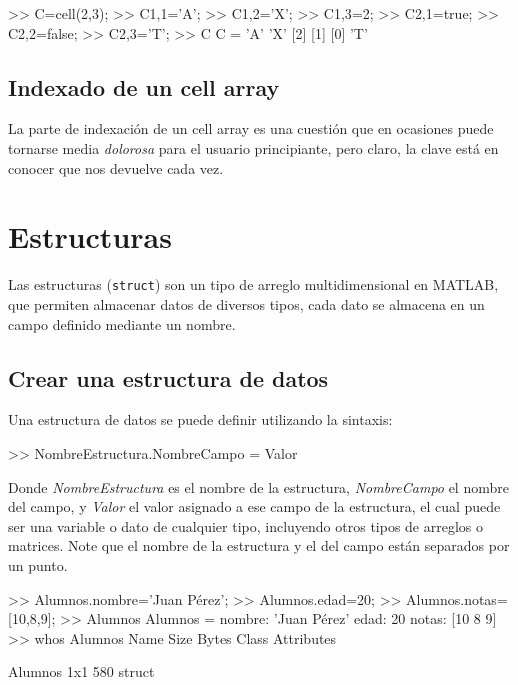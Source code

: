 \begin{matlab}
>> C=cell(2,3);
>> C{1,1}='A';
>> C{1,2}='X';
>> C{1,3}=2;
>> C{2,1}=true;
>> C{2,2}=false;
>> C{2,3}='T';
>> C
C = 
    'A'    'X'    [2]
    [1]    [0]    'T'
\end{matlab}

\subsection{Indexado de un cell array}\label{indexado-de-un-cell-array}

La parte de indexación de un cell array es una cuestión que en ocasiones
puede tornarse media \emph{dolorosa} para el usuario principiante, pero
claro, la clave está en conocer que nos devuelve cada vez.

\section{Estructuras}\label{estructuras}

Las estructuras (\texttt{struct}) son un tipo de arreglo
multidimensional en MATLAB, que permiten almacenar datos de diversos
tipos, cada dato se almacena en un campo definido mediante un nombre.

\subsection{Crear una estructura de datos}\label{crear-una-estructura-de-datos}

Una estructura de datos se puede definir utilizando la sintaxis:

\begin{matlab}
>> NombreEstructura.NombreCampo = Valor
\end{matlab}

Donde \emph{NombreEstructura} es el nombre de la estructura,
\emph{NombreCampo} el nombre del campo, y \emph{Valor} el valor asignado
a ese campo de la estructura, el cual puede ser una variable o dato de
cualquier tipo, incluyendo otros tipos de arreglos o matrices. Note que
el nombre de la estructura y el del campo están separados por un punto.

\begin{matlab}
>> Alumnos.nombre='Juan Pérez';
>> Alumnos.edad=20;
>> Alumnos.notas=[10,8,9];
>> Alumnos
Alumnos = 
    nombre: 'Juan Pérez'
      edad: 20
     notas: [10 8 9]
>> whos Alumnos
  Name         Size            Bytes  Class     Attributes

  Alumnos      1x1               580  struct      
\end{matlab}

